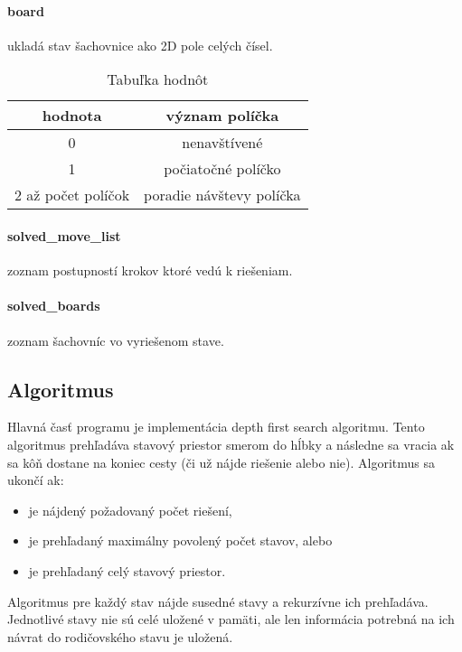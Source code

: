 \paragraph{board}\label{par:board} ukladá stav šachovnice ako 2D pole celých čísel.
\begin{table}[!ht]
    \centering
    \caption{Tabuľka hodnôt}
    \label{tab:tabuľka-hodnôt}
    \begin{tabular}{cc}
        \toprule
        hodnota            & význam políčka           \\ \midrule
        0                  & nenavštívené             \\
        1                  & počiatočné políčko       \\
        2 až počet políčok & poradie návštevy políčka \\ \bottomrule
    \end{tabular}
\end{table}

\paragraph{solved\_move\_list}\label{par:solved-move-list} zoznam postupností
krokov ktoré vedú k riešeniam.

\paragraph{solved\_boards} zoznam šachovníc vo vyriešenom stave.


\subsection{Algoritmus}\label{sec:algoritmus}

Hlavná časť programu je implementácia depth first search algoritmu.
Tento algoritmus prehľadáva stavový priestor smerom do hĺbky a následne sa vracia
ak sa kôň dostane na koniec cesty (či už nájde riešenie alebo nie).
Algoritmus sa ukončí ak:
\begin{itemize}
    \item je nájdený požadovaný počet riešení,
    \item je prehľadaný maximálny povolený počet stavov, alebo
    \item je prehľadaný celý stavový priestor.
\end{itemize}

Algoritmus pre každý stav nájde susedné stavy a rekurzívne ich prehľadáva.
Jednotlivé stavy nie sú celé uložené v pamäti, ale len informácia potrebná na
ich návrat do rodičovského stavu je uložená.


